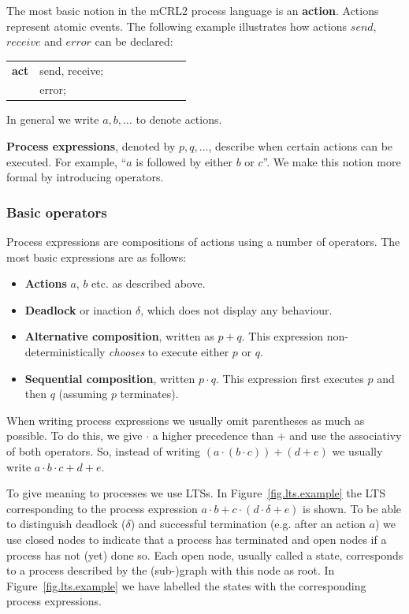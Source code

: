 \documentclass[a4paper,fleqn]{article}
\makeatletter
\newcommand{\f}[1]{\ensuremath{\mathit{#1}}}
\newcommand{\deffont}[1]{\textbf{#1}}
\newcommand{\seq}{\mathbin{\cdot}}
\newcommand{\alt}{\mathbin{+}}
\newenvironment{mcrl2}%
{\par\bigskip\noindent%
 \begin{tabular}{@{}>{\bf}p{2.3em}L@{\ }L@{\ }L@{\ }L@{\ }L@{\ }L@{\ }L@{\ }L}%
}%
{\end{tabular}\bigskip\par%
}
\makeatother
\begin{document}
The most basic notion in the mCRL2 process language is an \deffont{action}.
Actions represent atomic events. The following example illustrates how actions
$\f{send}$, $\f{receive}$ and $\f{error}$ can be declared:
\begin{mcrl2}
act & send, receive;\\
    & error;
\end{mcrl2}

\noindent
In general we write $a,b,\ldots$ to denote actions.

\deffont{Process expressions}, denoted by $p,q,\ldots$, describe when certain
actions can be executed. For example, ``$a$ is followed by either $b$ or $c$''. We
make this notion more formal by introducing operators.

\subsubsection{Basic operators}
\label{ssec:basic operators}

\noindent
Process expressions are compositions of actions using a number of operators.
The most basic expressions are as follows:
\begin{itemize}
\item \deffont{Actions} $a$, $b$ etc. as described above.

\item \deffont{Deadlock} or inaction $\delta$, which does not display any
behaviour.

\item \deffont{Alternative composition}, written as $p \alt q$. This
expression non-deterministically \emph{chooses} to execute either $p$ or $q$.

\item \deffont{Sequential composition}, written $p \seq q$. This expression
first executes $p$ and then $q$ (assuming $p$ terminates).
\end{itemize}

\noindent
When writing process expressions we usually omit parentheses as much as
possible. To do this, we give $\seq$ a higher precedence than $\alt$ and use
the associativy of both operators. So, instead of writing $(a\seq (b\seq
c))\alt(d\alt e)$ we usually write $a\seq b\seq c\alt d\alt e$.

To give meaning to processes we use LTSs. In Figure~\ref{fig.lts.example} the
LTS corresponding to the process expression $a\seq b\alt c\seq(d\seq\delta\alt
e)$ is shown. To be able to distinguish deadlock ($\delta$) and successful
termination (e.g. after an action $a$) we use closed nodes to indicate that a
process has terminated and open nodes if a process has not (yet) done so. Each
open node, usually called a state, corresponds to a process described by the
(sub-)graph with this node as root. In Figure~\ref{fig.lts.example} we have
labelled the states with the corresponding process expressions.
\end{document}
